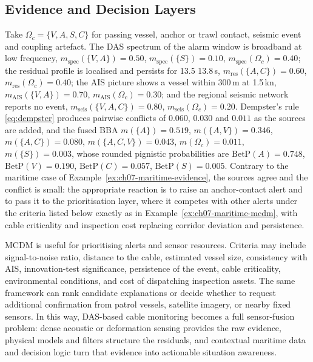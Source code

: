 \documentclass[graybox,envcountchap]{style/SNmono}
\providecommand{\DIFadd}[1]{{\protect\color{blue} #1}} %
\providecommand{\DIFdel}[1]{{\protect\color{red} #1}} %
\providecommand{\DIFaddbegin}{} %
\providecommand{\DIFaddend}{} %
\providecommand{\DIFdelbegin}{} %
\providecommand{\DIFdelend}{} %
\begin{document}
\subsection{Evidence and Decision Layers}
\label{subsec:cable-evidence-decision}
\begin{example}
\label{ex:ch07-cable-evidence}
Take $\Omega_c=\{V,A,S,C\}$ for passing vessel, anchor or trawl contact, seismic event and coupling artefact. The DAS spectrum of the alarm window is broadband at low frequency, $m_{\mathrm{spec}}(\{V,A\})=0.50$, $m_{\mathrm{spec}}(\{S\})=0.10$, $m_{\mathrm{spec}}(\Omega_c)=0.40$; the residual profile is localised and persists for \DIFdelbegin \DIFdel{13.5}\DIFdelend \DIFaddbegin \DIFadd{13.8}\DIFaddend \,s, $m_{\mathrm{res}}(\{A,C\})=0.60$, $m_{\mathrm{res}}(\Omega_c)=0.40$; the AIS picture shows a vessel within 300\,m at 1.5\,kn, $m_{\mathrm{AIS}}(\{V,A\})=0.70$, $m_{\mathrm{AIS}}(\Omega_c)=0.30$; and the regional seismic network reports no event, $m_{\mathrm{seis}}(\{V,A,C\})=0.80$, $m_{\mathrm{seis}}(\Omega_c)=0.20$. Dempster's rule \eqref{eq:dempster} produces pairwise conflicts of $0.060$, $0.030$ and $0.011$ as the sources are added, and the fused BBA $m(\{A\})=0.519$, $m(\{A,V\})=0.346$, $m(\{A,C\})=0.080$, $m(\{A,C,V\})=0.043$, $m(\Omega_c)=0.011$, $m(\{S\})=0.003$, whose \DIFaddbegin \DIFadd{rounded }\DIFaddend pignistic probabilities are $\mathrm{BetP}(A)=0.748$, $\mathrm{BetP}(V)=0.190$, $\mathrm{BetP}(C)=0.057$, $\mathrm{BetP}(S)=0.005$. Contrary to the maritime case of Example~\ref{ex:ch07-maritime-evidence}, the sources agree and the conflict is small: the appropriate reaction is to raise an anchor-contact alert and to pass it to the prioritisation layer, where it competes with other alerts under the criteria listed below exactly as in Example~\ref{ex:ch07-maritime-mcdm}, with cable criticality and inspection cost replacing corridor deviation and persistence.
\end{example}


MCDM is useful for prioritising alerts and sensor resources. Criteria may include signal-to-noise ratio, distance to the cable, estimated vessel size, consistency with AIS, innovation-test significance, persistence of the event, cable criticality, environmental conditions, and cost of dispatching inspection assets. The same framework can rank candidate explanations or decide whether to request additional confirmation from patrol vessels, satellite imagery, or nearby fixed sensors. In this way, DAS-based cable monitoring becomes a full sensor-fusion problem: dense acoustic or deformation sensing provides the raw evidence, physical models and filters structure the residuals, and contextual maritime data and decision logic turn that evidence into actionable situation awareness.
\end{document}
